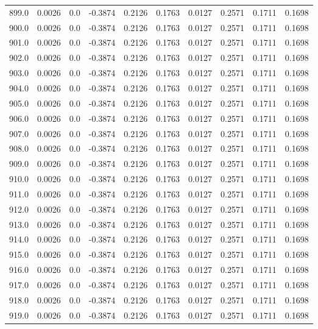 \begin{longtable}{lrrrrrrrrr}
899.0 & 0.0026 & 0.0 & -0.3874 & 0.2126 & 0.1763 & 0.0127 & 0.2571 & 0.1711 & 0.1698 \\
900.0 & 0.0026 & 0.0 & -0.3874 & 0.2126 & 0.1763 & 0.0127 & 0.2571 & 0.1711 & 0.1698 \\
901.0 & 0.0026 & 0.0 & -0.3874 & 0.2126 & 0.1763 & 0.0127 & 0.2571 & 0.1711 & 0.1698 \\
902.0 & 0.0026 & 0.0 & -0.3874 & 0.2126 & 0.1763 & 0.0127 & 0.2571 & 0.1711 & 0.1698 \\
903.0 & 0.0026 & 0.0 & -0.3874 & 0.2126 & 0.1763 & 0.0127 & 0.2571 & 0.1711 & 0.1698 \\
904.0 & 0.0026 & 0.0 & -0.3874 & 0.2126 & 0.1763 & 0.0127 & 0.2571 & 0.1711 & 0.1698 \\
905.0 & 0.0026 & 0.0 & -0.3874 & 0.2126 & 0.1763 & 0.0127 & 0.2571 & 0.1711 & 0.1698 \\
906.0 & 0.0026 & 0.0 & -0.3874 & 0.2126 & 0.1763 & 0.0127 & 0.2571 & 0.1711 & 0.1698 \\
907.0 & 0.0026 & 0.0 & -0.3874 & 0.2126 & 0.1763 & 0.0127 & 0.2571 & 0.1711 & 0.1698 \\
908.0 & 0.0026 & 0.0 & -0.3874 & 0.2126 & 0.1763 & 0.0127 & 0.2571 & 0.1711 & 0.1698 \\
909.0 & 0.0026 & 0.0 & -0.3874 & 0.2126 & 0.1763 & 0.0127 & 0.2571 & 0.1711 & 0.1698 \\
910.0 & 0.0026 & 0.0 & -0.3874 & 0.2126 & 0.1763 & 0.0127 & 0.2571 & 0.1711 & 0.1698 \\
911.0 & 0.0026 & 0.0 & -0.3874 & 0.2126 & 0.1763 & 0.0127 & 0.2571 & 0.1711 & 0.1698 \\
912.0 & 0.0026 & 0.0 & -0.3874 & 0.2126 & 0.1763 & 0.0127 & 0.2571 & 0.1711 & 0.1698 \\
913.0 & 0.0026 & 0.0 & -0.3874 & 0.2126 & 0.1763 & 0.0127 & 0.2571 & 0.1711 & 0.1698 \\
914.0 & 0.0026 & 0.0 & -0.3874 & 0.2126 & 0.1763 & 0.0127 & 0.2571 & 0.1711 & 0.1698 \\
915.0 & 0.0026 & 0.0 & -0.3874 & 0.2126 & 0.1763 & 0.0127 & 0.2571 & 0.1711 & 0.1698 \\
916.0 & 0.0026 & 0.0 & -0.3874 & 0.2126 & 0.1763 & 0.0127 & 0.2571 & 0.1711 & 0.1698 \\
917.0 & 0.0026 & 0.0 & -0.3874 & 0.2126 & 0.1763 & 0.0127 & 0.2571 & 0.1711 & 0.1698 \\
918.0 & 0.0026 & 0.0 & -0.3874 & 0.2126 & 0.1763 & 0.0127 & 0.2571 & 0.1711 & 0.1698 \\
919.0 & 0.0026 & 0.0 & -0.3874 & 0.2126 & 0.1763 & 0.0127 & 0.2571 & 0.1711 & 0.1698 \\

\end{longtable}
